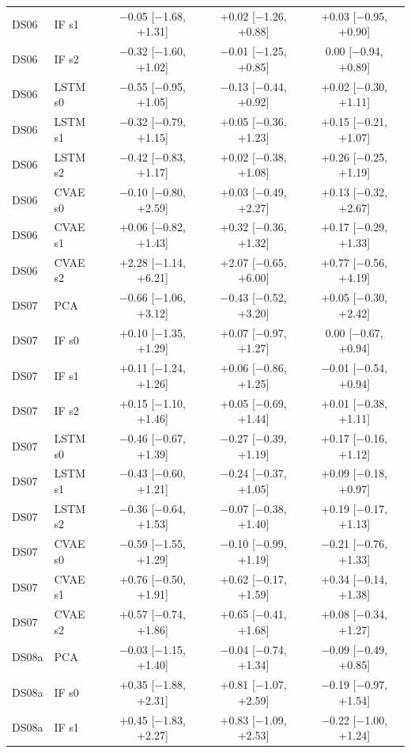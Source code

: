 \documentclass[10pt]{article}
\begin{document}
{\begin{longtable}{llccc}
DS06 & IF s1 & −0.05 [−1.68, +1.31] & +0.02 [−1.26, +0.88] & +0.03 [−0.95, +0.90] \\
DS06 & IF s2 & −0.32 [−1.60, +1.02] & −0.01 [−1.25, +0.85] & 0.00 [−0.94, +0.89] \\
DS06 & LSTM s0 & −0.55 [−0.95, +1.05] & −0.13 [−0.44, +0.92] & +0.02 [−0.30, +1.11] \\
DS06 & LSTM s1 & −0.32 [−0.79, +1.15] & +0.05 [−0.36, +1.23] & +0.15 [−0.21, +1.07] \\
DS06 & LSTM s2 & −0.42 [−0.83, +1.17] & +0.02 [−0.38, +1.08] & +0.26 [−0.25, +1.19] \\
DS06 & CVAE s0 & −0.10 [−0.80, +2.59] & +0.03 [−0.49, +2.27] & +0.13 [−0.32, +2.67] \\
DS06 & CVAE s1 & +0.06 [−0.82, +1.43] & +0.32 [−0.36, +1.32] & +0.17 [−0.29, +1.33] \\
DS06 & CVAE s2 & +2.28 [−1.14, +6.21] & +2.07 [−0.65, +6.00] & +0.77 [−0.56, +4.19] \\
\midrule
DS07 & PCA & −0.66 [−1.06, +3.12] & −0.43 [−0.52, +3.20] & +0.05 [−0.30, +2.42] \\
DS07 & IF s0 & +0.10 [−1.35, +1.29] & +0.07 [−0.97, +1.27] & 0.00 [−0.67, +0.94] \\
DS07 & IF s1 & +0.11 [−1.24, +1.26] & +0.06 [−0.86, +1.25] & −0.01 [−0.54, +0.94] \\
DS07 & IF s2 & +0.15 [−1.10, +1.46] & +0.05 [−0.69, +1.44] & +0.01 [−0.38, +1.11] \\
DS07 & LSTM s0 & −0.46 [−0.67, +1.39] & −0.27 [−0.39, +1.19] & +0.17 [−0.16, +1.12] \\
DS07 & LSTM s1 & −0.43 [−0.60, +1.21] & −0.24 [−0.37, +1.05] & +0.09 [−0.18, +0.97] \\
DS07 & LSTM s2 & −0.36 [−0.64, +1.53] & −0.07 [−0.38, +1.40] & +0.19 [−0.17, +1.13] \\
DS07 & CVAE s0 & −0.59 [−1.55, +1.29] & −0.10 [−0.99, +1.19] & −0.21 [−0.76, +1.33] \\
DS07 & CVAE s1 & +0.76 [−0.50, +1.91] & +0.62 [−0.17, +1.59] & +0.34 [−0.14, +1.38] \\
DS07 & CVAE s2 & +0.57 [−0.74, +1.86] & +0.65 [−0.41, +1.68] & +0.08 [−0.34, +1.27] \\
\midrule
DS08a & PCA & −0.03 [−1.15, +1.40] & −0.04 [−0.74, +1.34] & −0.09 [−0.49, +0.85] \\
DS08a & IF s0 & +0.35 [−1.88, +2.31] & +0.81 [−1.07, +2.59] & −0.19 [−0.97, +1.54] \\
DS08a & IF s1 & +0.45 [−1.83, +2.27] & +0.83 [−1.09, +2.53] & −0.22 [−1.00, +1.24] \\

\end{longtable}}
\end{document}
